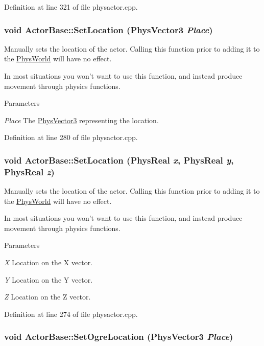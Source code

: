 Definition at line 321 of file physactor.cpp.\hypertarget{classActorBase_a2a204add0b036de441ebd59d14939000}{
\subsubsection[{SetLocation}]{\setlength{\rightskip}{0pt plus 5cm}void ActorBase::SetLocation ({\bf PhysVector3} {\em Place})}}
\label{dd/d7b/classActorBase_a2a204add0b036de441ebd59d14939000}


Manually sets the location of the actor. Calling this function prior to adding it to the \hyperlink{classPhysWorld}{PhysWorld} will have no effect. \par
 In most situations you won't want to use this function, and instead produce movement through physics functions. 
\begin{DoxyParams}{Parameters}
\item[{\em Place}]The \hyperlink{classPhysVector3}{PhysVector3} representing the location. \end{DoxyParams}


Definition at line 280 of file physactor.cpp.\hypertarget{classActorBase_a34848d620c5d9d2796999edbdcb77c9a}{
\subsubsection[{SetLocation}]{\setlength{\rightskip}{0pt plus 5cm}void ActorBase::SetLocation (PhysReal {\em x}, \/  PhysReal {\em y}, \/  PhysReal {\em z})}}
\label{dd/d7b/classActorBase_a34848d620c5d9d2796999edbdcb77c9a}


Manually sets the location of the actor. Calling this function prior to adding it to the \hyperlink{classPhysWorld}{PhysWorld} will have no effect. \par
 In most situations you won't want to use this function, and instead produce movement through physics functions. 
\begin{DoxyParams}{Parameters}
\item[{\em X}]Location on the X vector. \item[{\em Y}]Location on the Y vector. \item[{\em Z}]Location on the Z vector. \end{DoxyParams}


Definition at line 274 of file physactor.cpp.\hypertarget{classActorBase_a3140cc5c1c630efc1c04c20ada319b8b}{
\subsubsection[{SetOgreLocation}]{\setlength{\rightskip}{0pt plus 5cm}void ActorBase::SetOgreLocation ({\bf PhysVector3} {\em Place})}}
\label{dd/d7b/classActorBase_a3140cc5c1c630efc1c04c20ada319b8b}


